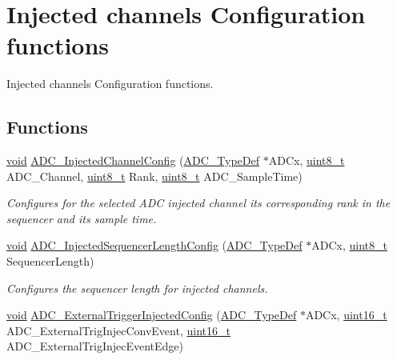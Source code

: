 \hypertarget{group___a_d_c___group6}{\section{Injected channels Configuration functions}
\label{group___a_d_c___group6}
}


Injected channels Configuration functions.  


\subsection*{Functions}
\begin{DoxyCompactItemize}
\item 
\hyperlink{group___n_a_m_e_ga18028b8badbf1ea7e704ccac3c488e82}{void} \hyperlink{group___a_d_c___group6_gae2b44bff080184e1cf6f2cb6b9bb3e59}{A\-D\-C\-\_\-\-Injected\-Channel\-Config} (\hyperlink{struct_a_d_c___type_def}{A\-D\-C\-\_\-\-Type\-Def} $\ast$A\-D\-Cx, \hyperlink{stdint_8h_aba7bc1797add20fe3efdf37ced1182c5}{uint8\-\_\-t} A\-D\-C\-\_\-\-Channel, \hyperlink{stdint_8h_aba7bc1797add20fe3efdf37ced1182c5}{uint8\-\_\-t} Rank, \hyperlink{stdint_8h_aba7bc1797add20fe3efdf37ced1182c5}{uint8\-\_\-t} A\-D\-C\-\_\-\-Sample\-Time)
\begin{DoxyCompactList}\small\item\em Configures for the selected A\-D\-C injected channel its corresponding rank in the sequencer and its sample time. \end{DoxyCompactList}\item 
\hyperlink{group___n_a_m_e_ga18028b8badbf1ea7e704ccac3c488e82}{void} \hyperlink{group___a_d_c___group6_gab7b02acec71ff12a8388bc70ab1e40f8}{A\-D\-C\-\_\-\-Injected\-Sequencer\-Length\-Config} (\hyperlink{struct_a_d_c___type_def}{A\-D\-C\-\_\-\-Type\-Def} $\ast$A\-D\-Cx, \hyperlink{stdint_8h_aba7bc1797add20fe3efdf37ced1182c5}{uint8\-\_\-t} Sequencer\-Length)
\begin{DoxyCompactList}\small\item\em Configures the sequencer length for injected channels. \end{DoxyCompactList}\item 
\hyperlink{group___n_a_m_e_ga18028b8badbf1ea7e704ccac3c488e82}{void} \hyperlink{group___a_d_c___group6_gabe8b7c5f81fe735c942612af3c2a6279}{A\-D\-C\-\_\-\-External\-Trigger\-Injected\-Config} (\hyperlink{struct_a_d_c___type_def}{A\-D\-C\-\_\-\-Type\-Def} $\ast$A\-D\-Cx, \hyperlink{stdint_8h_a273cf69d639a59973b6019625df33e30}{uint16\-\_\-t} A\-D\-C\-\_\-\-External\-Trig\-Injec\-Conv\-Event, \hyperlink{stdint_8h_a273cf69d639a59973b6019625df33e30}{uint16\-\_\-t} A\-D\-C\-\_\-\-External\-Trig\-Injec\-Event\-Edge)

\end{DoxyCompactItemize}

